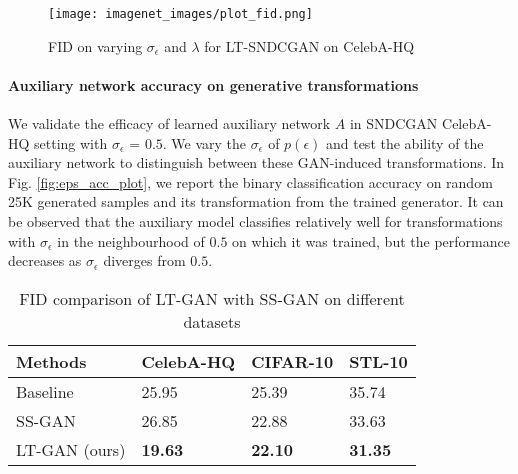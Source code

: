 \documentclass[10pt,twocolumn,letterpaper]{article}
\begin{document}
\begin{figure}[t]
\centering
    \texttt{[image: imagenet\_images/plot\_fid.png]}
    \caption{\footnotesize{FID on varying $\sigma_{\epsilon}$ and $\lambda$ for LT-SNDCGAN on CelebA-HQ}}
    \label{fig:ablation_hp}
\end{figure}

\vspace{-8pt}

\paragraph{Auxiliary network accuracy on generative transformations}
We validate the efficacy of learned auxiliary network $A$ in SNDCGAN CelebA-HQ setting with $\sigma_{\epsilon}$ = $0.5$. We vary the $\sigma_{\epsilon}$ of $p(\epsilon)$ and test the ability of the auxiliary network to distinguish between these GAN-induced transformations. In Fig. \ref{fig:eps_acc_plot}, we report the binary classification accuracy on random 25K generated samples and its transformation from the trained generator. It can be observed that the auxiliary model classifies relatively well for transformations with $\sigma_{\epsilon}$ in the neighbourhood of $0.5$ on which it was trained, but the performance decreases as $\sigma_{\epsilon}$ diverges from $0.5$.









\begin{table}[t]
\centering
\begin{tabular}{|l|l|l|l|}
\hline
 Methods  &    CelebA-HQ  & CIFAR-10  &  STL-10 \\ \hline
Baseline &    25.95     & 25.39     &   35.74    \\  
SS-GAN   &   26.85      & 22.88     &   33.63    \\ 
LT-GAN (ours)   &   \textbf{19.63}      &  \textbf{22.10}   &    \textbf{31.35}   \\ \hline

\end{tabular}
\caption{\footnotesize{FID comparison of LT-GAN with SS-GAN on different datasets}}
\label{tab:ssgan}
\end{table}

\vspace{-14pt}
\end{document}
